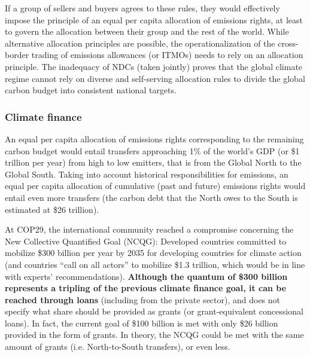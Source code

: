 \documentclass[12pt,english]{article}
\begin{document}
If a group of sellers and buyers agrees to these rules, they would effectively impose the principle of an equal per capita allocation of emissions rights, at least to govern the allocation between their group and the rest of the world. While alternative allocation principles are possible, the operationalization of the cross-border trading of emissions allowances (or ITMOs) needs to rely on an allocation principle. The inadequacy of NDCs (taken jointly) proves that the global climate regime cannot rely on diverse and self-serving allocation rules to divide the global carbon budget into consistent national targets. 


\subsubsection{Climate finance\label{subsubsec:finance}}

An equal per capita allocation of emissions rights corresponding to the remaining carbon budget would entail transfers approaching 1\% of the world's GDP (or \$1 trillion per year) from high to low emitters, that is from the Global North to the Global South. Taking into account historical responsibilities for emissions, an equal per capita allocation of cumulative (past and future) emissions rights would entail even more transfers (the carbon debt that the North owes to the South is estimated at \$26 trillion\cite{fabre_global_2024}). 

At COP29, the international community reached a compromise concerning the New Collective Quantified Goal (NCQG): Developed countries committed to mobilize \$300 billion per year by 2035 for developing countries for climate action (and countries ``call on all actors'' to mobilize \$1.3 trillion, which would be in line with experts' recommendations\cite{unfccc_new_2024,songwe_raising_2024}). \textbf{Although the quantum of \$300 billion represents a tripling of the previous climate finance goal, it can be reached through loans} (including from the private sector), and does not specify what share should be provided as grants (or grant-equivalent concessional loans). In fact, the current goal of \$100 billion is met with only \$26 billion provided in the form of grants. %
In theory, the NCQG could be met with the same amount of grants (i.e. North-to-South transfers), or even less. 
\end{document}
